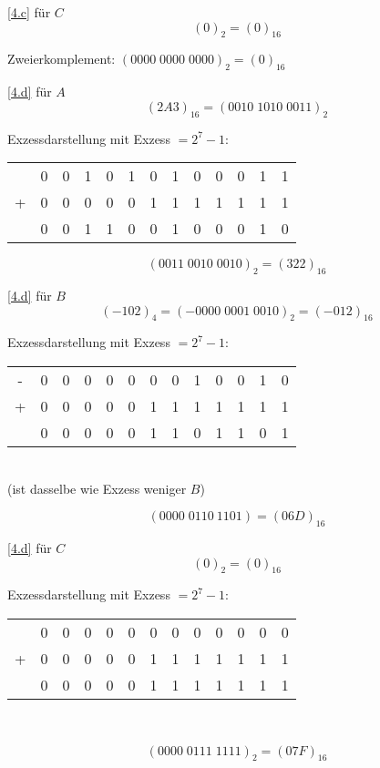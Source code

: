 \documentclass[a4paper, margins=3cm, newpage]{homework}
\begin{document}
\begin{solution}
\ref{4.c} für \(C\) \\
\[(0)_2 = (0)_{16}\]
\begin{center}
	Zweierkomplement: \((0000\;0000\;0000)_2 = (0)_{16}\)
\end{center}

\ref{4.d} für \(A\) \\
\[(2A3)_{16} = (0010\;1010\;0011)_2\]
\begin{center}
	Exzessdarstellung mit Exzess \(= 2^7 -1\): 
	\begin{tabular}{c@{\,}c@{\,}c@{\,}c@{\,}c@{\,}c@{\,}c@{\,}c@{\,}c@{\,}c@{\,}c@{\,}c@{\,}c@{\,}}
		& 0 & 0 & 1 & 0 & 1 & 0 & 1 & 0 & 0 & 0 & 1 & 1 \\
	+	& 0 & 0 & 0 & 0 & 0 & 1 & 1 & 1 & 1 & 1 & 1 & 1 \\
	\hline
		& 0 & 0 & 1 & 1 & 0 & 0 & 1 & 0 & 0 & 0 & 1 & 0
	\end{tabular}
	\[(0011\;0010\;0010)_2 = (322)_{16}\]
\end{center}

\ref{4.d} für \(B\)
\[(-102)_4 = (-0000\;0001\;0010)_2 = (-012)_{16}\]
\begin{center}
	Exzessdarstellung mit Exzess \(= 2^7 -1\): 
	\begin{tabular}{c@{\,}c@{\,}c@{\,}c@{\,}c@{\,}c@{\,}c@{\,}c@{\,}c@{\,}c@{\,}c@{\,}c@{\,}c@{\,}}
	-	& 0 & 0 & 0 & 0 & 0 & 0 & 0 & 1 & 0 & 0 & 1 & 0 \\
	+	& 0 & 0 & 0 & 0 & 0 & 1 & 1 & 1 & 1 & 1 & 1 & 1 \\
	\hline
		& 0 & 0 & 0 & 0 & 0 & 1 & 1 & 0 & 1 & 1 & 0 & 1
	\end{tabular} \\
	(ist dasselbe wie Exzess weniger \(B\))
\end{center}
\[(0000\;0110\:1101) = (06D)_{16}\]

\ref{4.d} für \(C\)
\[(0)_2 = (0)_{16}\]
\begin{center}
	Exzessdarstellung mit Exzess \(= 2^7 -1\): 
	\begin{tabular}{c@{\,}c@{\,}c@{\,}c@{\,}c@{\,}c@{\,}c@{\,}c@{\,}c@{\,}c@{\,}c@{\,}c@{\,}c@{\,}}
		& 0 & 0 & 0 & 0 & 0 & 0 & 0 & 0 & 0 & 0 & 0 & 0 \\
	+	& 0 & 0 & 0 & 0 & 0 & 1 & 1 & 1 & 1 & 1 & 1 & 1 \\
	\hline
		& 0 & 0 & 0 & 0 & 0 & 1 & 1 & 1 & 1 & 1 & 1 & 1
	\end{tabular} \\
\end{center}
\[(0000\;0111\;1111)_2 = (07F)_{16}\]
\end{solution}
\end{document}
